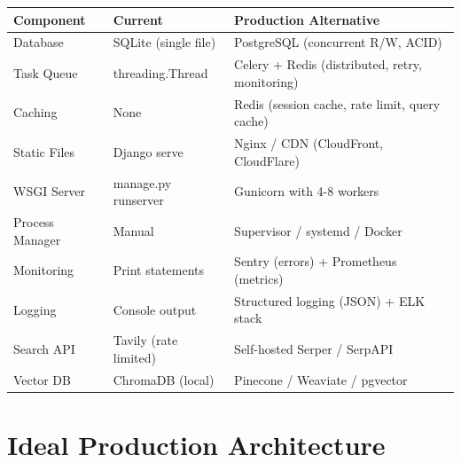 \documentclass[11pt,a4paper,twoside]{report}
\begin{document}
\begin{longtable}{|p{3cm}|p{4cm}|p{6cm}|}
\hline
\textbf{Component} & \textbf{Current} & \textbf{Production Alternative} \\
\hline
Database & SQLite (single file) & PostgreSQL (concurrent R/W, ACID) \\
\hline
Task Queue & threading.Thread & Celery + Redis (distributed, retry, monitoring) \\
\hline
Caching & None & Redis (session cache, rate limit, query cache) \\
\hline
Static Files & Django serve & Nginx / CDN (CloudFront, CloudFlare) \\
\hline
WSGI Server & manage.py runserver & Gunicorn with 4-8 workers \\
\hline
Process Manager & Manual & Supervisor / systemd / Docker \\
\hline
Monitoring & Print statements & Sentry (errors) + Prometheus (metrics) \\
\hline
Logging & Console output & Structured logging (JSON) + ELK stack \\
\hline
Search API & Tavily (rate limited) & Self-hosted Serper / SerpAPI \\
\hline
Vector DB & ChromaDB (local) & Pinecone / Weaviate / pgvector \\
\hline
\end{longtable}

\section{Ideal Production Architecture}
\end{document}
